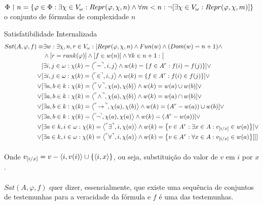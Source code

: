             $\Phi\restriction n = \SET{\varphi\in\Phi: \exists\chi\in V_\omega: Repr(\varphi, \chi, n)\land\forall m < n: \neg[\exists \chi \in V_\omega: Repr(\varphi, \chi, m)]}$ 
            o conjunto de fórmulas de complexidade $n$ 
        \begin{definition}{Satisfatibilidade Internalizada}
            \begin{align*}
                Sat(A,\varphi,f)\equiv&\exists w:\exists \chi,n,r\in V_\omega:[Repr(\varphi,\chi,n)\land Fun(w)\land (Dom(w) = n+1)\land\\
                    &\land [r = rank(\varphi)] \land [f\in w(n)]\land\forall k \in n+1:[\\
                            [&\exists i, j\in\omega     : \chi(k) = \TUPLE{\FMLA{\!\!=\!\!}}{  i    }{    j  } \land w(k) = \SET{f \in A^r : f(i)  = f(j)}]\lor\\
                        \lor[&\exists i, j\in\omega     : \chi(k) = \TUPLE{\FMLA{\!\!\in\!\!}}{i    }{    j  } \land w(k) = \SET{f \in A^r : f(i)\in f(j)}]\lor\\
                        \lor[&\exists a, b\in   k       : \chi(k) = \TUPLE{\FMLA{\!\lor\! }}{\chi(a)}{\chi(b)} \land w(k) = w(a)\cup w(b)]\lor\\
                        \lor[&\exists a, b\in   k       : \chi(k) = \TUPLE{\FMLA{\!\land\!}}{\chi(a)}{\chi(b)} \land w(k) = w(a)\cap w(b)]\lor\\
                        \lor[&\exists a, b\in   k       : \chi(k) = \TUPLE{\FMLA{\!\rar\!}}{\chi(a)}{\chi(b) } \land w(k) = (A^r - w(a))\cup w(b)]\lor\\
                        \lor[&\exists a, b\in   k       : \chi(k) = \TUPLE{\FMLA{\!\neg\!}}{\chi(a)}{\chi(a) } \land w(k) = (A^r - w(a))]\lor\\
                        \lor[&\exists a\in k, i\in\omega: \chi(k) = \TUPLE{\FMLA{\exists }}{   i   }{\chi(a) } \land w(k) = \SET{v\in A^r : \exists x\in A: v_{[i\slash x]}\in w(a) }]\lor\\
                        \lor[&\exists a\in k, i\in\omega: \chi(k) = \TUPLE{\FMLA{\forall }}{   i   }{\chi(a) } \land w(k) = \SET{v\in A^r : \forall x\in A: v_{[i\slash x]}\in w(a) }]]]
            \end{align*}
            
            \paragraph{}
                Onde $v_{[i\slash x]} = v - \TUPLE{i}{v(i)} \cup \SET{\TUPLE{i}{x}}$, ou seja, substituição do valor de $v$ em $i$ por $x$.
            \paragraph{}
                $Sat(A,\varphi,f)$ quer dizer, essencialmente, que existe uma sequência de conjuntos de testemunhas para a veracidade 
                da fórmula e $f$ é uma das testemunhas.
        \end{definition}
